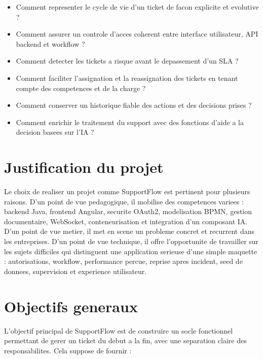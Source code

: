 \begin{itemize}[leftmargin=1.2cm]
  \item Comment representer le cycle de vie d'un ticket de facon explicite et evolutive ?
  \item Comment assurer un controle d'acces coherent entre interface utilisateur, API backend et workflow ?
  \item Comment detecter les tickets a risque avant le depassement d'un SLA ?
  \item Comment faciliter l'assignation et la reassignation des tickets en tenant compte des competences et de la charge ?
  \item Comment conserver un historique fiable des actions et des decisions prises ?
  \item Comment enrichir le traitement du support avec des fonctions d'aide a la decision basees sur l'IA ?
\end{itemize}

\section{Justification du projet}

Le choix de realiser un projet comme SupportFlow est pertinent pour plusieurs raisons. D'un point de vue pedagogique, il mobilise des competences variees : backend Java, frontend Angular, securite OAuth2, modelisation BPMN, gestion documentaire, WebSocket, conteneurisation et integration d'un composant IA. D'un point de vue metier, il met en scene un probleme concret et recurrent dans les entreprises. D'un point de vue technique, il offre l'opportunite de travailler sur les sujets difficiles qui distinguent une application serieuse d'une simple maquette : autorisations, workflow, performance percue, reprise apres incident, seed de donnees, supervision et experience utilisateur.

\section{Objectifs generaux}

L'objectif principal de SupportFlow est de construire un socle fonctionnel permettant de gerer un ticket du debut a la fin, avec une separation claire des responsabilites. Cela suppose de fournir :

